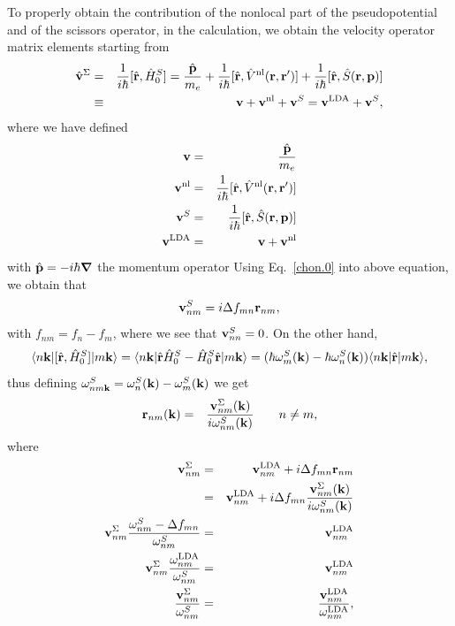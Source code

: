 \documentclass[floatfix,prb,aps,superscriptaddress,11pt,preprint]{revtex4}
\begin{document}
To properly obtain the contribution of the nonlocal part of the
pseudopotential and of the scissors operator, 
in the calculation, we obtain
the velocity operator matrix elements starting from
\begin{eqnarray}\label{vop}
\hat{\mathbf{v}}^\Sigma&=&
\frac{1}{i\hbar}[\hat{\mathbf{r}},\hat{H}^S_0]
=\frac{\hat{\mathbf{p}}}{m_e}
+
\frac{1}{i\hbar}[\hat{\mathbf{r}},\hat V^{\mathrm{nl}}(\mathbf{r},\mathbf{r}')]
+
\frac{1}{i\hbar}[\hat{\mathbf{r}},\hat S(\mathbf{r},\mathbf{p})]
\nonumber\\
&\equiv&
\mathbf{v}
+
\mathbf{v}^{\mathrm{nl}}
+\mathbf{v}^S
=
\mathbf{v}^{\mathrm{LDA}}
+\mathbf{v}^S
,
\end{eqnarray}
where we have defined
\begin{eqnarray}\label{conhr}
\mathbf{v}
&=&\frac{\hat{\mathbf{p}}}{m_e}
\nonumber\\
\mathbf{v}^{\mathrm{nl}}
&=&
\frac{1}{i\hbar}[\hat{\mathbf{r}},\hat V^{\mathrm{nl}}(\mathbf{r},\mathbf{r}')]
\nonumber\\
\mathbf{v}^S
&=&
\frac{1}{i\hbar}[\hat{\mathbf{r}},\hat S(\mathbf{r},\mathbf{p})]
\nonumber\\
\mathbf{v}^{\mathrm{LDA}}
&=&
\mathbf{v}
+\mathbf{v}^{\mathrm{nl}}
\end{eqnarray}  
with $\hat{\mathbf{p}}=-i\hbar\boldsymbol{\nabla}$ the momentum operator
Using Eq.~\eqref{chon.0} into above equation, we obtain that
\begin{equation}\label{chon.2} 
\mathbf{v}^S_{nm}=i\Delta f_{mn}\mathbf{r}_{nm},
\end{equation}
with $f_{nm}=f_n-f_m$,
where we see that $\mathbf{v}^S_{nn}=0$.
On the other hand,
\begin{equation}\label{conhrnm}
\langle n\mathbf{k} |
[\hat{\mathbf{r}},\hat{H}^S_0]
| m\mathbf{k} \rangle=\langle n\mathbf{k} |\hat{\mathbf{r}}\hat{H}^S_0-\hat{H}^S_0\hat{\mathbf{r}}| m\mathbf{k} \rangle
=(\hbar\omega^S_m(\mathbf{k})-\hbar\omega^S_n(\mathbf{k}))\langle n\mathbf{k} |\hat{\mathbf{r}}| m\mathbf{k} \rangle
,
\end{equation}
thus defining $\omega^S_{nm\mathbf{k}}=\omega^S_n(\mathbf{k})-\omega^S_m(\mathbf{k})$ we get
\begin{eqnarray}\label{pmnrmn}
\mathbf{r}_{nm}(\mathbf{k})
&=&
\frac{\mathbf{v}^\Sigma_{nm}(\mathbf{k})}{i\omega^S_{nm}(\mathbf{k})}
\quad\quad n\ne m
,
\end{eqnarray} 
where
\begin{eqnarray}\label{chon.8}
\mathbf{v}^\Sigma_{nm}
&=&
\mathbf{v}^{\mathrm{LDA}}_{nm}+i\Delta f_{mn}\mathbf{r}_{nm}
\nonumber\\
&=&
\mathbf{v}^{\mathrm{LDA}}_{nm}+i\Delta f_{mn}\frac{\mathbf{v}^\Sigma_{nm}(\mathbf{k})}{i\omega^S_{nm}(\mathbf{k})}
\nonumber\\
\mathbf{v}^\Sigma_{nm}
\frac{\omega^S_{nm}-\Delta f_{mn}}{\omega^S_{nm}}
&=&
\mathbf{v}^{\mathrm{LDA}}_{nm}
\nonumber\\
\mathbf{v}^\Sigma_{nm}
\frac{\omega^{\mathrm{LDA}}_{nm}}{\omega^S_{nm}}
&=&
\mathbf{v}^{\mathrm{LDA}}_{nm}
\nonumber\\
\frac{\mathbf{v}^\Sigma_{nm}}{\omega^S_{nm}}
&=&
\frac{\mathbf{v}^{\mathrm{LDA}}_{nm}}{\omega^{\mathrm{LDA}}_{nm}}
,
\end{eqnarray}
\end{document}
